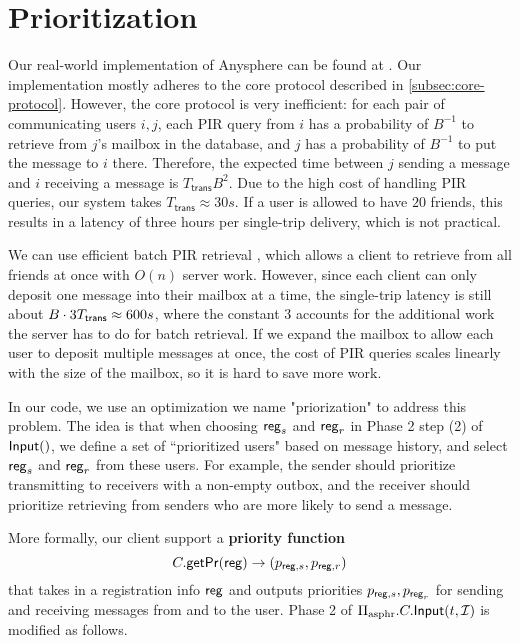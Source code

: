\section{Prioritization}
\label{sec:actual-asphr-protocol}
Our real-world implementation of Anysphere can be found at \cite{LZA2022implementation}. Our implementation mostly adheres to the core protocol described in \cref{subsec:core-protocol}. However, the core protocol is very inefficient: for each pair of communicating users $i, j$, each PIR query from $i$ has a probability of $B^{-1}$ to retrieve from $j$'s mailbox in the database, and $j$ has a probability of $B^{-1}$ to put the message to $i$ there. Therefore, the expected time between $j$ sending a message and $i$ receiving a message is $T_{\mathsf{trans}} B^2$. Due to the high cost of handling PIR queries, our system takes $T_{\mathsf{trans}} \approx 30s$. If a user is allowed to have $20$ friends, this results in a latency of three hours per single-trip delivery, which is not practical.

We can use efficient batch PIR retrieval \cite{BIM2000multiretrival, YERA2004batchcode, angel2016unobservable, liutromer2021}, which allows a client to retrieve from all friends at once with $O(n)$ server work. However, since each client can only deposit one message into their mailbox at a time, the single-trip latency is still about $B \cdot 3T_{\mathsf{trans}} \approx 600s$, where the constant $3$ accounts for the additional work the server has to do for batch retrieval. If we expand the mailbox to allow each user to deposit multiple messages at once, the cost of PIR queries scales linearly with the size of the mailbox, so it is hard to save more work.

In our code, we use an optimization we name "priorization" to address this problem. The idea is that when choosing $\mathsf{reg}_s$ and $\mathsf{reg}_r$ in Phase 2 step (2) of $\mathsf{Input}()$, we define a set of ``prioritized users" based on message history, and select $\mathsf{reg}_s$ and $\mathsf{reg}_r$ from these users. For example, the sender should prioritize transmitting to receivers with a non-empty outbox, and the receiver should prioritize retrieving from senders who are more likely to send a message.

More formally, our client support a \textbf{priority function}
$$C.\mathsf{getPr}(\mathsf{reg}) \to (p_{\mathsf{reg}, s}, p_{\mathsf{reg}, r})$$
that takes in a registration info $\mathsf{reg}$ and outputs priorities $p_{\mathsf{reg}, s}, p_{\mathsf{reg}_r}$ for sending and receiving messages from and to the user. Phase 2 of $\Pi_{\text{asphr}}.C.\mathsf{Input}(t, \mathcal{I})$ is modified as follows.

